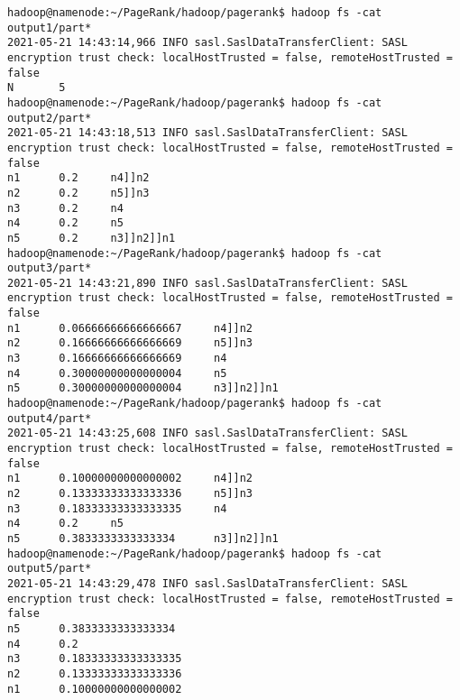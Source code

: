 \documentclass[11pt,a4paper]{article}
\begin{document}
\begin{lstlisting}[]
hadoop@namenode:~/PageRank/hadoop/pagerank$ hadoop fs -cat output1/part*
2021-05-21 14:43:14,966 INFO sasl.SaslDataTransferClient: SASL encryption trust check: localHostTrusted = false, remoteHostTrusted = false
N       5
hadoop@namenode:~/PageRank/hadoop/pagerank$ hadoop fs -cat output2/part*
2021-05-21 14:43:18,513 INFO sasl.SaslDataTransferClient: SASL encryption trust check: localHostTrusted = false, remoteHostTrusted = false
n1      0.2     n4]]n2
n2      0.2     n5]]n3
n3      0.2     n4
n4      0.2     n5
n5      0.2     n3]]n2]]n1
hadoop@namenode:~/PageRank/hadoop/pagerank$ hadoop fs -cat output3/part*
2021-05-21 14:43:21,890 INFO sasl.SaslDataTransferClient: SASL encryption trust check: localHostTrusted = false, remoteHostTrusted = false
n1      0.06666666666666667     n4]]n2
n2      0.16666666666666669     n5]]n3
n3      0.16666666666666669     n4
n4      0.30000000000000004     n5
n5      0.30000000000000004     n3]]n2]]n1
hadoop@namenode:~/PageRank/hadoop/pagerank$ hadoop fs -cat output4/part*
2021-05-21 14:43:25,608 INFO sasl.SaslDataTransferClient: SASL encryption trust check: localHostTrusted = false, remoteHostTrusted = false
n1      0.10000000000000002     n4]]n2
n2      0.13333333333333336     n5]]n3
n3      0.18333333333333335     n4
n4      0.2     n5
n5      0.3833333333333334      n3]]n2]]n1
hadoop@namenode:~/PageRank/hadoop/pagerank$ hadoop fs -cat output5/part*
2021-05-21 14:43:29,478 INFO sasl.SaslDataTransferClient: SASL encryption trust check: localHostTrusted = false, remoteHostTrusted = false
n5      0.3833333333333334
n4      0.2
n3      0.18333333333333335
n2      0.13333333333333336
n1      0.10000000000000002
\end{lstlisting}
\end{document}
